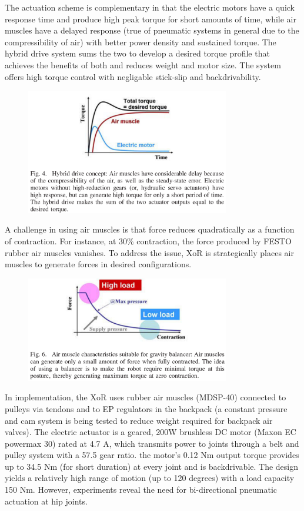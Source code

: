The actuation scheme is complementary in that the electric motors have a quick response time and produce high peak torque for short amounts of time, while air muscles have a delayed response (true of pneumatic systems in general due to the compressibility of air) with better power density and sustained torque.  The hybrid drive system sums the two to develop a desired torque profile that achieves the benefits of both and reduces weight and motor size.  The system offers high torque control with negligable stick-slip and backdrivability.

\begin{figure}[ht]
  \centering
  \includegraphics[width=3.5in]{exos/figs/xor_hybrid_drive_torque_time.png}
\end{figure}  

A challenge in using air muscles is that force reduces quadratically as a function of contraction.  For instance, at 30\% contraction, the force produced by FESTO rubber air muscles vanishes.  To address the issue, XoR is strategically places air muscles to generate forces in desired configurations.  

\begin{figure}[ht]
  \centering
  \includegraphics[width=3.5in]{exos/figs/xor_air_muscle_force_vs_contraction.png}
\end{figure}

In implementation, the XoR uses rubber air muscles (MDSP-40) connected to pulleys via tendons and to EP regulators in the backpack (a constant pressure and cam system is being tested to reduce weight required for backpack air valves).  The electric actuator is a geared, 200W brushless DC motor (Maxon EC powermax 30) rated at 4.7 A, which transmits power to joints through a belt and pulley system with a 57.5 gear ratio. the motor's 0.12 Nm output torque provides up to 34.5 Nm (for short duration) at every joint and is backdrivable.  The design yields a relatively high range of motion (up to 120 degrees) with a load capacity 150 Nm.  However, experiments reveal the need for bi-directional pneumatic actuation at hip joints.

